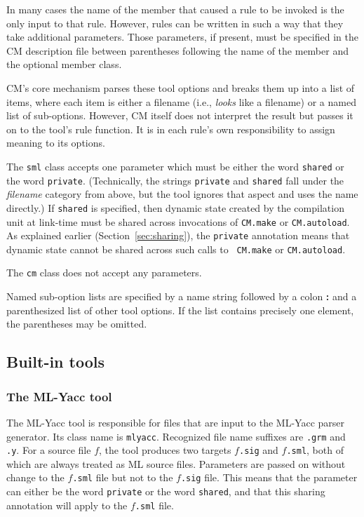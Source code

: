 \documentclass{article}
\begin{document}
In many cases the name of the member that caused a rule to be invoked
is the only input to that rule.  However, rules can be written in such
a way that they take additional parameters.  Those parameters, if
present, must be specified in the CM description file between
parentheses following the name of the member and the optional member
class.

CM's core mechanism parses these tool options and breaks them up into
a list of items, where each item is either a filename (i.e., {\em
looks} like a filename) or a named list of sub-options.  However, CM
itself does not interpret the result but passes it on to the tool's
rule function.  It is in each rule's own responsibility to assign
meaning to its options.

The {\tt sml} class accepts one parameter which must be either the
word {\tt shared} or the word {\tt private}.  (Technically, the
strings {\tt private} and {\tt shared} fall under the {\em filename}
category from above, but the tool ignores that aspect and uses the
name directly.) If {\tt shared} is specified, then dynamic state
created by the compilation unit at link-time must be shared across
invocations of {\tt CM.make} or {\tt CM.autoload}.  As explained
earlier (Section~\ref{sec:sharing}), the {\tt private} annotation
means that dynamic state cannot be shared across such calls to {\tt
CM.make} or {\tt CM.autoload}.

The {\tt cm} class does not accept any parameters.

Named sub-option lists are specified by a name string followed by a
colon {\bf :} and a parenthesized list of other tool options.  If the
list contains precisely one element, the parentheses may be omitted.

\subsection{Built-in tools}

\subsubsection*{The ML-Yacc tool}

The ML-Yacc tool is responsible for files that are input to the
ML-Yacc parser generator.  Its class name is {\tt mlyacc}.  Recognized
file name suffixes are {\tt .grm} and {\tt .y}.  For a source file
$f$, the tool produces two targets $f${\tt .sig} and $f${\tt .sml},
both of which are always treated as ML source files.  Parameters are
passed on without change to the $f${\tt .sml} file but not to the
$f${\tt .sig} file.  This means that the parameter can either be the
word {\tt private} or the word {\tt shared}, and that this sharing
annotation will apply to the $f${\tt .sml} file.
\end{document}
